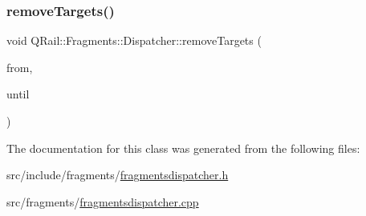 \mbox{\label{classQRail_1_1Fragments_1_1Dispatcher_a21d4df9c73acc71f39b5323d79439896}} 
\subsubsection{\texorpdfstring{removeTargets()}{removeTargets()}}
{\footnotesize\ttfamily void Q\+Rail\+::\+Fragments\+::\+Dispatcher\+::remove\+Targets (\begin{DoxyParamCaption}\item[{const Q\+Date\+Time \&}]{from,  }\item[{const Q\+Date\+Time \&}]{until }\end{DoxyParamCaption})}



The documentation for this class was generated from the following files\+:\begin{DoxyCompactItemize}
\item 
src/include/fragments/\mbox{\hyperlink{fragmentsdispatcher_8h}{fragmentsdispatcher.\+h}}\item 
src/fragments/\mbox{\hyperlink{fragmentsdispatcher_8cpp}{fragmentsdispatcher.\+cpp}}\end{DoxyCompactItemize}
